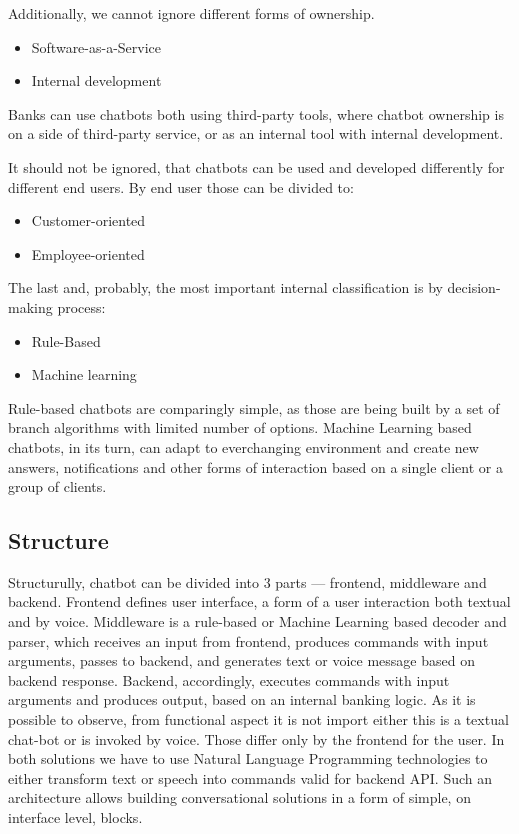 Additionally, we cannot ignore different forms of ownership.
\begin{itemize}
    \item Software-as-a-Service
    \item Internal development
\end{itemize}
Banks can use chatbots both using third-party tools, where chatbot ownership is on a side of third-party service, or as an internal tool with internal development. 

It should not be ignored, that chatbots can be used and developed differently for different end users.
By end user those can be divided to:
\begin{itemize}
    \item Customer-oriented
    \item Employee-oriented
\end{itemize}

The last and, probably, the most important internal classification is by decision-making process:
\begin{itemize}
    \item Rule-Based
    \item Machine learning
\end{itemize}

Rule-based chatbots are comparingly simple, as those are being built by a set of branch algorithms with limited number of options.
Machine Learning based chatbots, in its turn, can adapt to everchanging environment and create new answers, notifications and other forms of interaction based on a single client or a group of clients.


\subsection{Structure}

Structurully, chatbot can be divided into 3 parts — frontend, middleware and backend.
Frontend defines user interface, a form of a user interaction both textual and by voice.
Middleware is a rule-based or Machine Learning based decoder and parser, which receives an input from frontend, produces commands with input arguments, passes to backend, and generates text or voice message based on backend response.
Backend, accordingly, executes commands with input arguments and produces output, based on an internal banking logic.
As it is possible to observe, from functional aspect it is not import either this is a textual chat-bot or is invoked by voice.
Those differ only by the frontend for the user.
In both solutions we have to use Natural Language Programming technologies to either transform text or speech into commands valid for backend API.
Such an architecture allows building conversational solutions in a form of simple, on interface level, blocks.

